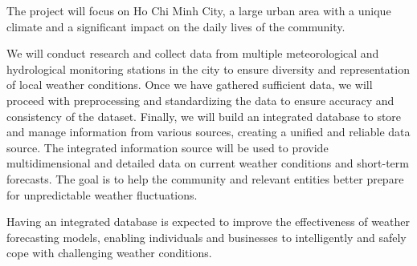 The project will focus on Ho Chi Minh City, a large urban area with a unique climate and a significant impact on the daily lives of the community.

We will conduct research and collect data from multiple meteorological and hydrological monitoring stations in the city to ensure diversity and representation of local weather conditions. Once we have gathered sufficient data, we will proceed with preprocessing and standardizing the data to ensure accuracy and consistency of the dataset. Finally, we will build an integrated database to store and manage information from various sources, creating a unified and reliable data source. The integrated information source will be used to provide multidimensional and detailed data on current weather conditions and short-term forecasts. The goal is to help the community and relevant entities better prepare for unpredictable weather fluctuations.

Having an integrated database is expected to improve the effectiveness of weather forecasting models, enabling individuals and businesses to intelligently and safely cope with challenging weather conditions.